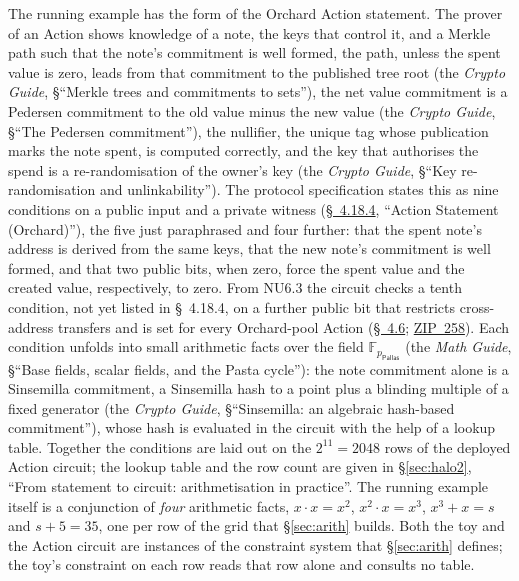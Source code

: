 \documentclass[11pt,a4paper]{article}
\theoremstyle{definition}
\newcommand{\F}{\mathbb{F}}
\newcommand{\Pallas}{\ensuremath{\mathsf{Pallas}}}
\begin{document}
The running example has the form of the Orchard Action statement. The
prover of an Action shows knowledge of a note, the keys that control
it, and a Merkle path such that the note's commitment is well formed,
the path, unless the spent value is zero, leads from that commitment to
the published tree root (the
\emph{Crypto Guide}, \S``Merkle trees and commitments to sets''), the
net value commitment is a Pedersen commitment to the old value minus
the new value (the \emph{Crypto Guide}, \S``The Pedersen
commitment''), the nullifier, the unique tag whose publication marks
the note spent, is computed correctly, and the key that authorises the
spend is a re-randomisation of the owner's key (the \emph{Crypto
Guide}, \S``Key re-randomisation and unlinkability''). The protocol
specification states this as nine conditions on a public input and a private
witness
(\href{https://zips.z.cash/protocol/protocol.pdf\#actionstatement}{\S~4.18.4},
``Action Statement (Orchard)''), the five just paraphrased and four further:
that the spent note's address is derived from the same keys, that the new note's
commitment is well formed, and that two public bits, when zero, force the spent
value and the created value, respectively, to zero. From NU6.3 the circuit
checks a tenth condition, not yet listed in \S~4.18.4, on a further public
bit that restricts cross-address transfers and is set for every Orchard-pool
Action
(\href{https://zips.z.cash/protocol/nu6_3.pdf\#actiondesc}{\S~4.6};
\href{https://zips.z.cash/zip-0258}{ZIP~258}).
Each condition unfolds into small arithmetic facts over the field
$\F_{p_{\Pallas}}$ (the \emph{Math Guide}, \S``Base fields, scalar
fields, and the Pasta cycle''): the note commitment alone is a
Sinsemilla commitment, a Sinsemilla hash to a point plus a blinding
multiple of a fixed generator (the \emph{Crypto Guide},
\S``Sinsemilla: an algebraic hash-based commitment''), whose hash is
evaluated in the circuit with the help of a lookup table. Together the
conditions are laid out on the $2^{11} = 2048$ rows of the deployed
Action circuit; the lookup table and the row count are given in
\S\ref{sec:halo2}, ``From statement to circuit: arithmetisation in
practice''. The running example itself is a conjunction of \emph{four}
arithmetic facts, $x \cdot x = x^2$, $x^2 \cdot x = x^3$,
$x^3 + x = s$ and $s + 5 = 35$, one per row of the grid that
\S\ref{sec:arith} builds. Both the toy and the Action circuit are
instances of the constraint system that \S\ref{sec:arith} defines; the
toy's constraint on each row reads that row alone and consults no table.
\end{document}
